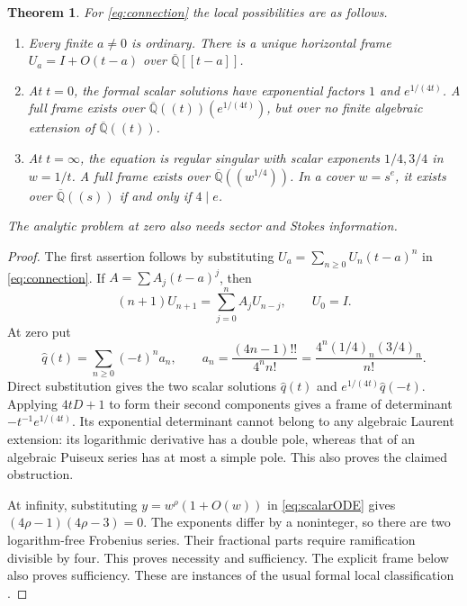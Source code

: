 \documentclass[11pt]{article}
\newtheorem{theorem}{Theorem}[section]
\theoremstyle{definition}
\newcommand{\Q}{\mathbb Q}
\numberwithin{equation}{section}
\begin{document}
\begin{theorem}\label{thm:local}
For \eqref{eq:connection} the local possibilities are as follows.
\begin{enumerate}
\item Every finite $a\ne0$ is ordinary. There is a unique horizontal frame
$U_a=I+O(t-a)$ over $\overline{\Q}[[t-a]]$.
\item At $t=0$, the formal scalar solutions have exponential factors
$1$ and $e^{1/(4t)}$. A full frame exists over
$\overline{\Q}((t))(e^{1/(4t)})$, but over no finite algebraic extension
of $\overline{\Q}((t))$.
\item At $t=\infty$, the equation is regular singular with scalar
exponents $1/4,3/4$ in $w=1/t$. A full frame exists over
$\overline{\Q}((w^{1/4}))$. In a cover $w=s^e$, it exists over
$\overline{\Q}((s))$ if and only if $4\mid e$.
\end{enumerate}
The analytic problem at zero also needs sector and Stokes information.
\end{theorem}
\begin{proof}
The first assertion follows by substituting $U_a=\sum_{n\ge0}U_n(t-a)^n$
in \eqref{eq:connection}. If $A=\sum A_j(t-a)^j$, then
\begin{equation}\label{eq:Taylor}
 (n+1)U_{n+1}=\sum_{j=0}^n A_jU_{n-j},\qquad U_0=I.
\end{equation}
At zero put
\begin{equation}\label{eq:weak}
 \widehat q(t)=\sum_{n\ge0}(-t)^n a_n,\qquad
 a_n=\frac{(4n-1)!!}{4^n n!}
     =\frac{4^n(1/4)_n(3/4)_n}{n!}.
\end{equation}
Direct substitution gives the two scalar solutions
$\widehat q(t)$ and $e^{1/(4t)}\widehat q(-t)$.
Applying $4tD+1$ to form their second components gives a frame of
determinant $-t^{-1}e^{1/(4t)}$. Its exponential determinant cannot
belong to any algebraic Laurent extension: its logarithmic derivative
has a double pole, whereas that of an algebraic Puiseux series has at
most a simple pole. This also proves the claimed obstruction.

At infinity, substituting $y=w^\rho(1+O(w))$ in
\eqref{eq:scalarODE} gives $(4\rho-1)(4\rho-3)=0$.
The exponents differ by a noninteger, so there are two logarithm-free
Frobenius series. Their fractional parts require ramification divisible
by four. This proves necessity and sufficiency. The explicit frame below
also proves sufficiency. These are instances of the usual formal local
classification \cite[Section 1.4]{Singer}.
\end{proof}
\end{document}
